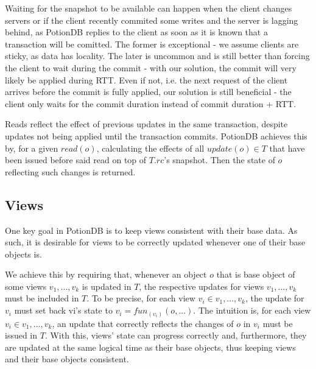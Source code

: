 \documentclass{vldb}
\begin{document}
Waiting for the snapshot to be available can happen when the client changes servers or if the client recently commited some writes and the server is lagging behind, as PotionDB replies to the client as soon as it is known that a transaction will be comitted.
The former is exceptional - we assume clients are sticky, as data has locality.
The later is uncommon and is still better than forcing the client to wait during the commit - with our solution, the commit will very likely be applied during RTT.
Even if not, i.e. the next request of the client arrives before the commit is fully applied, our solution is still beneficial -  the client only waits for the commit duration instead of commit duration + RTT.

Reads reflect the effect of previous updates in the same transaction, despite updates not being applied until the transaction commits.
PotionDB achieves this by, for a given $read(o)$, calculating the effects of all $update(o) \in T$ that have been issued before said read on top of $T.rc$'s snapshot.
Then the state of $o$ reflecting such changes is returned.

\subsection{Views}
\label{subsec:viewsTransaction}

One key goal in PotionDB is to keep views consistent with their base data.
As such, it is desirable for views to be correctly updated whenever one of their base objects is.

We achieve this by requiring that, whenever an object $o$ that is base object of some views $v_1, ..., v_k$ is updated in $T$, the respective updates for views $v_1, ..., v_k$ must be included in $T$.
To be precise, for each view $v_i \in v_1, ..., v_k$, the update for $v_i$ must set back vi’s state to $v_i = fun_{(v_i)}(o, ...)$.
The intuition is, for each view $v_i \in v_1, ..., v_k$, an update that correctly reflects the changes of $o$ in $v_i$ must be issued in $T$.
With this, views' state can progress correctly and, furthermore, they are updated at the same logical time as their base objects, thus keeping views and their base objects consistent.
\end{document}
